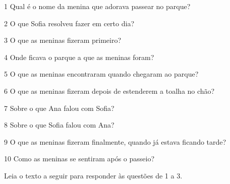 \num{1} Qual é o nome da menina que adorava passear no parque?



\num{2} O que Sofia resolveu fazer em certo dia?



\num{3} O que as meninas fizeram primeiro?



\num{4} Onde ficava o parque a que as meninas foram?



\num{5} O que as meninas encontraram quando chegaram ao parque?



\num{6} O que as meninas fizeram depois de estenderem a toalha no chão?



\num{7} Sobre o que Ana falou com Sofia?



\num{8} Sobre o que Sofia falou com Ana?



\num{9} O que as meninas fizeram finalmente, quando já estava ficando tarde?



\num{10} Como as meninas se sentiram após o passeio?




Leia o texto a seguir para responder às questões de 1 a 3.

